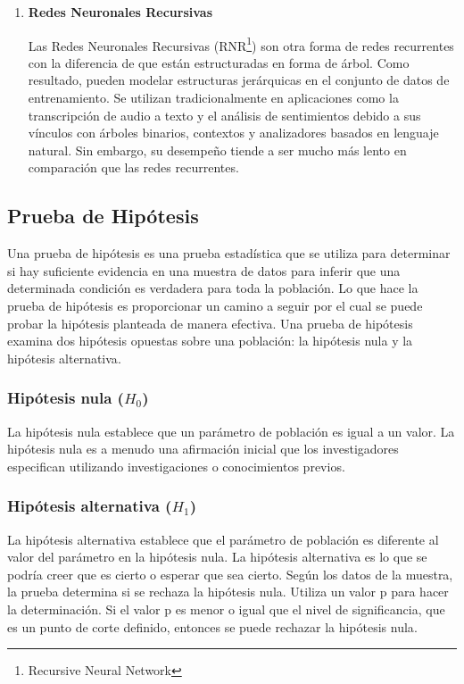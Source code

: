 \begin{enumerate}[label=\textbf{\arabic*})]
	\item \textbf{Redes Neuronales Recursivas}
	
	Las Redes Neuronales Recursivas (RNR\footnote{Recursive Neural Network}) son otra forma de redes recurrentes con la diferencia de que están estructuradas en forma de árbol. Como resultado, pueden modelar estructuras jerárquicas en el conjunto de datos de entrenamiento. Se utilizan tradicionalmente en aplicaciones como la transcripción de audio a texto y el análisis de sentimientos debido a sus vínculos con árboles binarios, contextos y analizadores basados en lenguaje natural. Sin embargo, su desempeño tiende a ser mucho más lento en comparación que las redes recurrentes\cite{Karagiannakos2020}.
\end{enumerate}

\subsection{Prueba de Hipótesis}
Una prueba de hipótesis es una prueba estadística que se utiliza para determinar si hay suficiente evidencia en una muestra de datos para inferir que una determinada condición es verdadera para toda la población. Lo que hace la prueba de hipótesis es proporcionar un camino a seguir por el cual se puede probar la hipótesis planteada de manera efectiva. Una prueba de hipótesis examina dos hipótesis opuestas sobre una población: la hipótesis nula y la hipótesis alternativa\cite{Aggarwal2018}. 


\subsubsection{Hipótesis nula ($H_{0}$)}

La hipótesis nula establece que un parámetro de población es igual a un valor. La hipótesis nula es a menudo una afirmación inicial que los investigadores especifican utilizando investigaciones o conocimientos previos\cite{Aggarwal2018}.

\subsubsection{Hipótesis alternativa ($H_{1}$)}

La hipótesis alternativa establece que el parámetro de población es diferente al valor del parámetro en la hipótesis nula. La hipótesis alternativa es lo que se podría creer que es cierto o esperar que sea cierto. Según los datos de la muestra, la prueba determina si se rechaza la hipótesis nula. Utiliza un valor p para hacer la determinación. Si el valor p es menor o igual que el nivel de significancia, que es un punto de corte definido, entonces se puede rechazar la hipótesis nula\cite{Aggarwal2018}.


